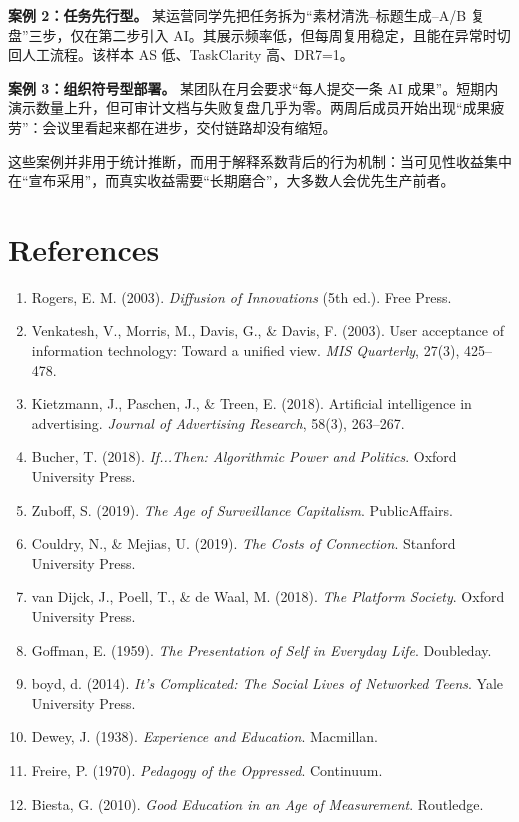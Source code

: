 \documentclass[11pt,a4paper]{ctexart}
\begin{document}
\textbf{案例 2：任务先行型。} 某运营同学先把任务拆为“素材清洗--标题生成--A/B 复盘”三步，仅在第二步引入 AI。其展示频率低，但每周复用稳定，且能在异常时切回人工流程。该样本 AS 低、TaskClarity 高、DR7=1。

\textbf{案例 3：组织符号型部署。} 某团队在月会要求“每人提交一条 AI 成果”。短期内演示数量上升，但可审计文档与失败复盘几乎为零。两周后成员开始出现“成果疲劳”：会议里看起来都在进步，交付链路却没有缩短。

这些案例并非用于统计推断，而用于解释系数背后的行为机制：当可见性收益集中在“宣布采用”，而真实收益需要“长期磨合”，大多数人会优先生产前者。

\section*{References}
\begin{enumerate}[leftmargin=1.2em]
\item Rogers, E. M. (2003). \textit{Diffusion of Innovations} (5th ed.). Free Press.
\item Venkatesh, V., Morris, M., Davis, G., \& Davis, F. (2003). User acceptance of information technology: Toward a unified view. \textit{MIS Quarterly}, 27(3), 425--478.
\item Kietzmann, J., Paschen, J., \& Treen, E. (2018). Artificial intelligence in advertising. \textit{Journal of Advertising Research}, 58(3), 263--267.
\item Bucher, T. (2018). \textit{If...Then: Algorithmic Power and Politics}. Oxford University Press.
\item Zuboff, S. (2019). \textit{The Age of Surveillance Capitalism}. PublicAffairs.
\item Couldry, N., \& Mejias, U. (2019). \textit{The Costs of Connection}. Stanford University Press.
\item van Dijck, J., Poell, T., \& de Waal, M. (2018). \textit{The Platform Society}. Oxford University Press.
\item Goffman, E. (1959). \textit{The Presentation of Self in Everyday Life}. Doubleday.
\item boyd, d. (2014). \textit{It’s Complicated: The Social Lives of Networked Teens}. Yale University Press.
\item Dewey, J. (1938). \textit{Experience and Education}. Macmillan.
\item Freire, P. (1970). \textit{Pedagogy of the Oppressed}. Continuum.
\item Biesta, G. (2010). \textit{Good Education in an Age of Measurement}. Routledge.

\end{enumerate}
\end{document}
